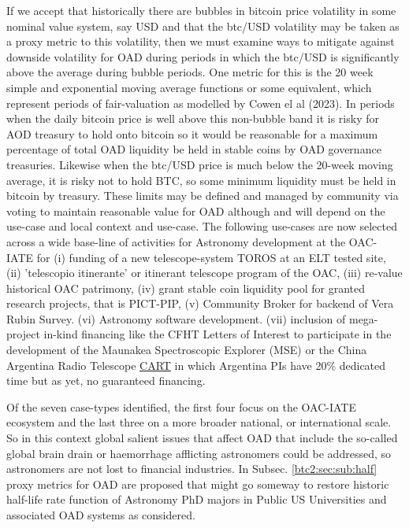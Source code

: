 \documentclass[final,5p,times,twocolumn,authoryear]{elsarticle}
\begin{document}
If we accept that historically there are bubbles in bitcoin price volatility in some nominal value system, say USD and that the btc/USD volatility may be taken as a proxy metric to this volatility, then we must examine ways to mitigate against downside volatility for OAD during periods in which the btc/USD is significantly above the average during bubble periods. One metric for this is the 20 week simple and exponential moving average functions or some equivalent, which represent periods of fair-valuation as modelled by Cowen el al (2023). In periods when the daily bitcoin price is well above this non-bubble band it is risky for AOD treasury to hold onto bitcoin so it would be reasonable for a maximum percentage of total OAD liquidity be held in stable coins by OAD governance treasuries. Likewise when the btc/USD price is much below the 20-week moving average, it is risky not to hold BTC, so some minimum liquidity must be held in bitcoin by treasury. These limits may be defined and managed by community via voting to maintain reasonable value for OAD although and will depend on the use-case and local context and use-case. The following use-cases are now selected across a wide base-line of activities for Astronomy development at the OAC-IATE for (i) funding of a new telescope-system TOROS at an ELT tested site, (ii) 'telescopio itinerante' or itinerant telescope program of the OAC, (iii) re-value historical OAC patrimony, (iv) grant stable coin liquidity pool for granted research projects, that is PICT-PIP, (v) Community Broker for backend of Vera Rubin Survey. (vi) Astronomy software development. (vii) inclusion of mega-project in-kind financing like the CFHT
Letters of Interest to participate in the development of the Maunakea
Spectroscopic Explorer (MSE) or the China Argentina Radio Telescope \href{http://cart.unsj.edu.ar/}{CART} in which Argentina PIs have 20\% dedicated time but as yet, no guaranteed financing. 

Of the seven case-types identified, the first four focus on the OAC-IATE ecosystem and the last three on a more broader national, or international scale.  So in this context global salient issues that affect OAD that include the so-called global brain drain or haemorrhage afflicting astronomers could be addressed, so astronomers are not lost to financial industries. In Subsec. \ref{btc2:sec:sub:half} proxy metrics for OAD are proposed that might go someway to restore historic half-life rate function of Astronomy PhD majors in Public US Universities and associated OAD systems as considered. 
\end{document}
